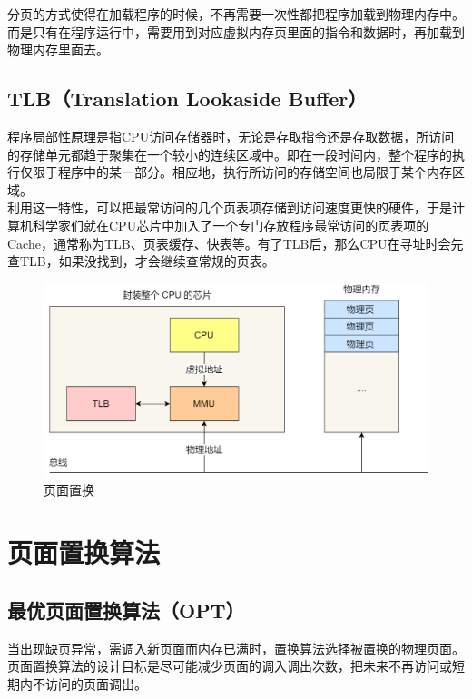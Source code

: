 分页的方式使得在加载程序的时候，不再需要一次性都把程序加载到物理内存中。而是只有在程序运行中，需要用到对应虚拟内存页里面的指令和数据时，再加载到物理内存里面去。\\

\subsection{TLB（Translation Lookaside Buffer）}

程序局部性原理是指CPU访问存储器时，无论是存取指令还是存取数据，所访问的存储单元都趋于聚集在一个较小的连续区域中。即在一段时间内，整个程序的执行仅限于程序中的某一部分。相应地，执行所访问的存储空间也局限于某个内存区域。\\

利用这一特性，可以把最常访问的几个页表项存储到访问速度更快的硬件，于是计算机科学家们就在CPU芯片中加入了一个专门存放程序最常访问的页表项的Cache，通常称为TLB、页表缓存、快表等。有了TLB后，那么CPU在寻址时会先查TLB，如果没找到，才会继续查常规的页表。

\begin{figure}[H]
    \centering
    \includegraphics[scale=0.4]{img/C3/3-5/4.png}
    \caption{页面置换}
\end{figure}

\newpage

\section{页面置换算法}

\subsection{最优页面置换算法（OPT）}

当出现缺页异常，需调入新页面而内存已满时，置换算法选择被置换的物理页面。页面置换算法的设计目标是尽可能减少页面的调入调出次数，把未来不再访问或短期内不访问的页面调出。\\


